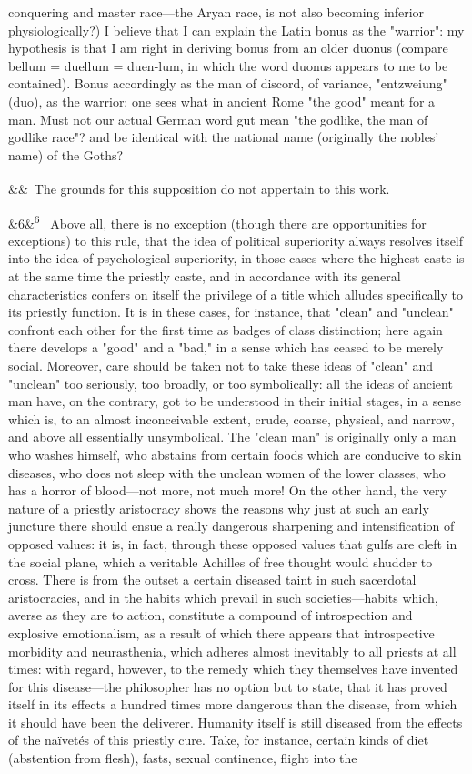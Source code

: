 \documentclass[12pt]{article}
\newcommand{\para}[1][]{\par\noindent\ifx&#1&\else\textsuperscript{\footnotesize #1}~\fi}
\begin{document}
conquering and master race---the Aryan race, is not also becoming inferior physiologically?) I believe that I can explain the Latin bonus as the "warrior": my hypothesis is that I am right in deriving bonus from an older duonus (compare bellum = duellum = duen-lum, in which the word duonus appears to me to be contained). Bonus accordingly as the man of discord, of variance, "entzweiung" (duo), as the warrior: one sees what in ancient Rome "the good" meant for a man. Must not our actual German word gut mean "the godlike, the man of godlike race"? and be identical with the national name (originally the nobles' name) of the Goths?

\para The grounds for this supposition do not appertain to this work.

\para[6] Above all, there is no exception (though there are opportunities for exceptions) to this rule, that the idea of political superiority always resolves itself into the idea of psychological superiority, in those cases where the highest caste is at the same time the priestly caste, and in accordance with its general characteristics confers on itself the privilege of a title which alludes specifically to its priestly function. It is in these cases, for instance, that "clean" and "unclean" confront each other for the first time as badges of class distinction; here again there develops a "good" and a "bad," in a sense which has ceased to be merely social. Moreover, care should be taken not to take these ideas of "clean" and "unclean" too seriously, too broadly, or too symbolically: all the ideas of ancient man have, on the contrary, got to be understood in their initial stages, in a sense which is, to an almost inconceivable extent, crude, coarse, physical, and narrow, and above all essentially unsymbolical. The "clean man" is originally only a man who washes himself, who abstains from certain foods which are conducive to skin diseases, who does not sleep with the unclean women of the lower classes, who has a horror of blood---not more, not much more! On the other hand, the very nature of a priestly aristocracy shows the reasons why just at such an early juncture there should ensue a really dangerous sharpening and intensification of opposed values: it is, in fact, through these opposed values that gulfs are cleft in the social plane, which a veritable Achilles of free thought would shudder to cross. There is from the outset a certain diseased taint in such sacerdotal aristocracies, and in the habits which prevail in such societies---habits which, averse as they are to action, constitute a compound of introspection and explosive emotionalism, as a result of which there appears that introspective morbidity and neurasthenia, which adheres almost inevitably to all priests at all times: with regard, however, to the remedy which they themselves have invented for this disease---the philosopher has no option but to state, that it has proved itself in its effects a hundred times more dangerous than the disease, from which it should have been the deliverer. Humanity itself is still diseased from the effects of the naïvetés of this priestly cure. Take, for instance, certain kinds of diet (abstention from flesh), fasts, sexual continence, flight into the 
\end{document}
